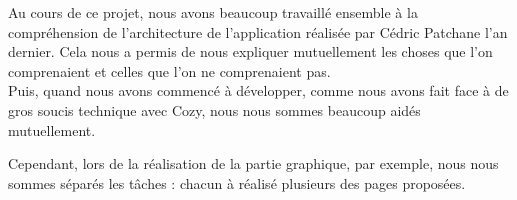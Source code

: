 Au cours de ce projet, nous avons beaucoup travaillé ensemble à la compréhension de l'architecture de l'application réalisée par Cédric Patchane l'an dernier. Cela nous a permis de nous expliquer mutuellement les choses que l'on comprenaient et celles que l'on ne comprenaient pas. \\

Puis, quand nous avons commencé à développer, comme nous avons fait face à de gros soucis technique avec Cozy, nous nous sommes beaucoup aidés mutuellement. 

Cependant, lors de la réalisation de la partie graphique, par exemple, nous nous sommes séparés les tâches : chacun à réalisé plusieurs des pages proposées.



